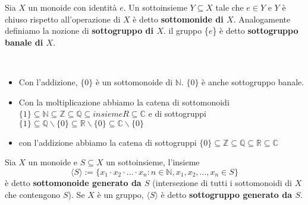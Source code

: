 \documentclass[../main.tex]{subfiles}
\begin{document}
\begin{definition}
    Sia $X$ un monoide con identità $e$.
    Un sottoinsieme $Y \subseteq X$ tale che $e \in Y$ e $Y$ è chiuso rispetto all'operazione di $X$ è detto \textbf{sottomonide di $X$}.
    Analogamente definiamo la nozione di \textbf{sottogruppo di $X$}.
    il gruppo \{$e$\} è detto \textbf{sottogruppo banale di $X$}.
\end{definition}

\begin{example}
    \
    \begin{itemize}
        \item Con l'addizione, $\{0\}$ è un sottomonoide di $\mathbb{N}$. $\{0\}$ è anche sottogruppo banale.
        \item Con la moltiplicazione abbiamo la catena di sottomonoidi $\{1\} \subseteq \mathbb{N} \subseteq
                  \mathbb{Z} \subseteq \mathbb{Q} \subseteq insieme R \subseteq  \mathbb{C}$ e di sottogruppi $\{1\}
                  \subseteq \mathbb{Q}\backslash \{0\} \subseteq \mathbb{R} \backslash \{0\} \subseteq \mathbb{C}
                  \backslash \{0\}$
        \item con l'addizione abbiamo la catena di sottogruppi $\{0\} \subseteq \mathbb{Z} \subseteq \mathbb{Q}
                  \subseteq \mathbb{R} \subseteq \mathbb{C}$
    \end{itemize}
\end{example}

\begin{definition}
    Sia $X$ un monoide e $S \subseteq X$ un sottoinsieme, l'insieme
    \begin{equation*}
        \langle S \rangle := \{ x_1 \cdot x_2 \cdot \ldots \cdot x_n : n \in \mathbb{N}, x_1,x_2,\ldots,x_n \in S \}
    \end{equation*}
    è detto \textbf{sottomonoide generato da $S$} (intersezione di tutti i sottomonoidi di $X$ che contengono $S$).
    Se $X$ è un gruppo, $\langle S \rangle$ è detto \textbf{sottogruppo generato da $S$}.
\end{definition}
\end{document}
